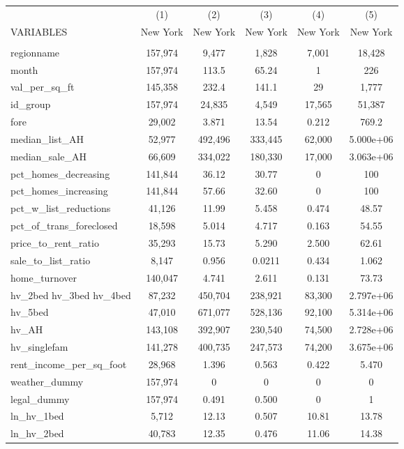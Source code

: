 \begin{tabular}{lccccc} \hline
 & (1) & (2) & (3) & (4) & (5) \\
VARIABLES & New York & New York & New York & New York & New York \\ \hline
 &  &  &  &  &  \\
regionname & 157,974 & 9,477 & 1,828 & 7,001 & 18,428 \\
month & 157,974 & 113.5 & 65.24 & 1 & 226 \\
val\_per\_sq\_ft & 145,358 & 232.4 & 141.1 & 29 & 1,777 \\
id\_group & 157,974 & 24,835 & 4,549 & 17,565 & 51,387 \\
fore & 29,002 & 3.871 & 13.54 & 0.212 & 769.2 \\
median\_list\_AH & 52,977 & 492,496 & 333,445 & 62,000 & 5.000e+06 \\
median\_sale\_AH & 66,609 & 334,022 & 180,330 & 17,000 & 3.063e+06 \\
pct\_homes\_decreasing & 141,844 & 36.12 & 30.77 & 0 & 100 \\
pct\_homes\_increasing & 141,844 & 57.66 & 32.60 & 0 & 100 \\
pct\_w\_list\_reductions & 41,126 & 11.99 & 5.458 & 0.474 & 48.57 \\
pct\_of\_trans\_foreclosed & 18,598 & 5.014 & 4.717 & 0.163 & 54.55 \\
price\_to\_rent\_ratio & 35,293 & 15.73 & 5.290 & 2.500 & 62.61 \\
sale\_to\_list\_ratio & 8,147 & 0.956 & 0.0211 & 0.434 & 1.062 \\
home\_turnover & 140,047 & 4.741 & 2.611 & 0.131 & 73.73 \\
hv\_2bed 
hv\_3bed 
hv\_4bed & 87,232 & 450,704 & 238,921 & 83,300 & 2.797e+06 \\
hv\_5bed & 47,010 & 671,077 & 528,136 & 92,100 & 5.314e+06 \\
hv\_AH & 143,108 & 392,907 & 230,540 & 74,500 & 2.728e+06 \\
hv\_singlefam & 141,278 & 400,735 & 247,573 & 74,200 & 3.675e+06 \\
rent\_income\_per\_sq\_foot & 28,968 & 1.396 & 0.563 & 0.422 & 5.470 \\
weather\_dummy & 157,974 & 0 & 0 & 0 & 0 \\
legal\_dummy & 157,974 & 0.491 & 0.500 & 0 & 1 \\
ln\_hv\_1bed & 5,712 & 12.13 & 0.507 & 10.81 & 13.78 \\
ln\_hv\_2bed & 40,783 & 12.35 & 0.476 & 11.06 & 14.38 \\

\end{tabular}
